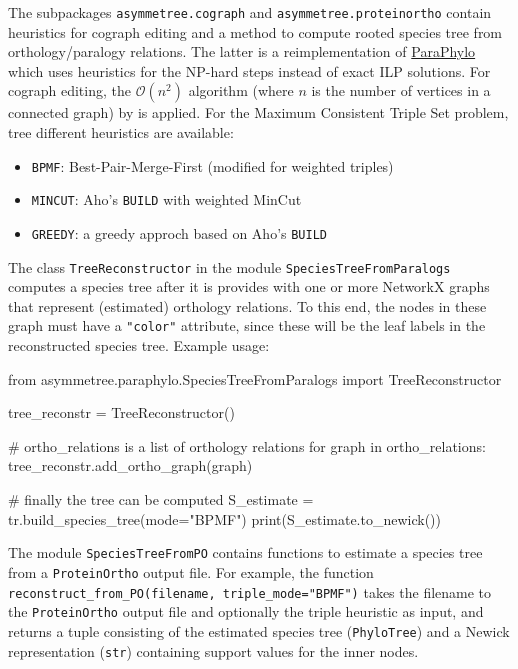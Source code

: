\documentclass[hidelinks,11pt]{article}
\begin{document}
The subpackages \texttt{asymmetree.cograph} and \texttt{asymmetree.proteinortho} contain heuristics for cograph editing and a method to compute rooted species tree from orthology/paralogy relations.
The latter is a reimplementation of \href{http://pacosy.informatik.uni-leipzig.de/208-0-ParaPhylo.html}{ParaPhylo} \citep{hellmuth2015} which uses heuristics for the NP-hard steps instead of exact ILP solutions.
For cograph editing, the $\mathcal{O}(n^2)$ algorithm (where $n$ is the number of vertices in a connected graph) by \citet{crespelle2019} is applied.
For the Maximum Consistent Triple Set problem, tree different heuristics are available:
\begin{itemize}
	\item \texttt{BPMF}: Best-Pair-Merge-First \citep{wu2004} (modified for weighted triples)
	\item \texttt{MINCUT}: Aho's \texttt{BUILD} with weighted MinCut \citep{aho1981,byrka2010}
	\item \texttt{GREEDY}: a greedy approch based on Aho's \texttt{BUILD}
\end{itemize}

The class \texttt{TreeReconstructor} in the module \texttt{SpeciesTreeFromParalogs} computes a species tree after it is provides with one or more NetworkX graphs that represent (estimated) orthology relations.
To this end, the nodes in these graph must have a \texttt{"color"} attribute, since these will be the leaf labels in the reconstructed species tree.
Example usage:
\begin{python}
from asymmetree.paraphylo.SpeciesTreeFromParalogs import TreeReconstructor

tree_reconstr = TreeReconstructor()

# ortho_relations is a list of orthology relations
for graph in ortho_relations:
    tree_reconstr.add_ortho_graph(graph)
    
# finally the tree can be computed
S_estimate = tr.build_species_tree(mode="BPMF")
print(S_estimate.to_newick())
\end{python}
\vspace{2mm}

The module \texttt{SpeciesTreeFromPO} contains functions to estimate a species tree from a \texttt{ProteinOrtho} output file. For example, the function \texttt{reconstruct\_from\_PO(filename, triple\_mode="BPMF")} takes the filename to the \texttt{ProteinOrtho} output file and optionally the triple heuristic as input, and returns a tuple consisting of the estimated species tree (\texttt{PhyloTree}) and a Newick representation (\texttt{str}) containing support values for the inner nodes.



\end{document}
